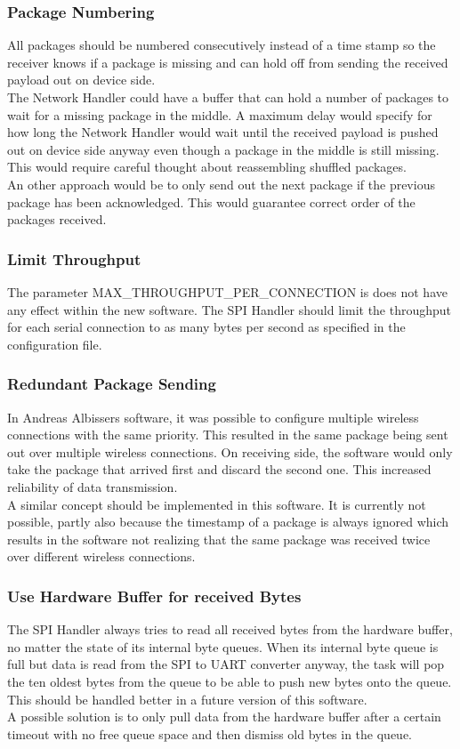 \subsubsection{Package Numbering}
All packages should be numbered consecutively instead of a time stamp so the receiver knows if a package is missing and can hold off from sending the received payload out on device side.\\
The Network Handler could have a buffer that can hold a number of packages to wait for a missing package in the middle. A maximum delay would specify for how long the Network Handler would wait until the received payload is pushed out on device side anyway even though a package in the middle is still missing.\\
This would require careful thought about reassembling shuffled packages.\\
An other approach would be to only send out the next package if the previous package has been acknowledged. This would guarantee correct order of the packages received.
%
\subsubsection{Limit Throughput}
The parameter MAX\_THROUGHPUT\_PER\_CONNECTION is does not have any effect within the new software. The SPI Handler should limit the throughput for each serial connection to as many bytes per second as specified in the configuration file.\\
%
\subsubsection{Redundant Package Sending}
In Andreas Albissers software, it was possible to configure multiple wireless connections with the same priority. This resulted in the same package being sent out over multiple wireless connections. On receiving side, the software would only take the package that arrived first and discard the second one. This increased reliability of data transmission.\\
A similar concept should be implemented in this software. It is currently not possible, partly also because the timestamp of a package is always ignored which results in the software not realizing that the same package was received twice over different wireless connections.
%
\subsubsection{Use Hardware Buffer for received Bytes}
The SPI Handler always tries to read all received bytes from the hardware buffer, no matter the state of its internal byte queues. When its internal byte queue is full but data is read from the SPI to UART converter anyway, the task will pop the ten oldest bytes from the queue to be able to push new bytes onto the queue. \\
This should be handled better in a future version of this software.\\
A possible solution is to only pull data from the hardware buffer after a certain timeout with no free queue space and then dismiss old bytes in the queue.
%
